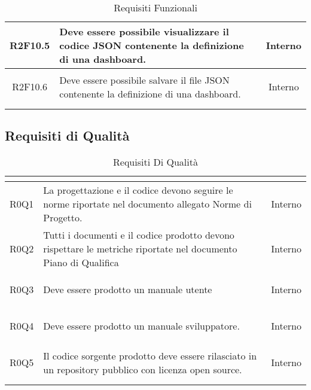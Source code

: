 \begin{longtable}{|c|H|c|}
	\hypertarget{R2F10.5}{R2F10.5} & Deve essere possibile visualizzare il codice JSON contenente la definizione di una dashboard. & Interno \\ \hline 
	\hypertarget{R2F10.6}{R2F10.6} & Deve essere possibile salvare il file JSON contenente la definizione di una dashboard. & Interno \\ \hline 
	
	
	\caption[Requisiti Funzionali]{Requisiti Funzionali}
	\label{tabella:req0}
\end{longtable}
\renewcommand{\arraystretch}{1}
\clearpage
{}
\subsection{Requisiti di Qualità}
\normalsize
\renewcommand{\arraystretch}{1.5}
\begin{longtable}{|c|H|c|}
	\hline
	\textbf{\color{title_text}{Id Requisito}} & \textbf{\color{title_text}{Descrizione}} & \textbf{\color{title_text}{Fonte}}\\
	\hline
	\endhead
	\hypertarget{R0Q1}{R0Q1} & La progettazione e il codice devono seguire le norme riportate nel documento allegato Norme di Progetto. & Interno \\ \hline 
	\hypertarget{R0Q2}{R0Q2} & Tutti i documenti e il codice prodotto devono rispettare le metriche riportate nel documento Piano di Qualifica & Interno \\ \hline 
	\hypertarget{R0Q3}{R0Q3} & Deve essere prodotto un manuale utente & Interno \\ \hline 
	\hypertarget{R0Q4}{R0Q4} & Deve essere prodotto un manuale sviluppatore. & Interno \\ \hline 
	\hypertarget{R0Q5}{R0Q5} & Il codice sorgente prodotto deve essere rilasciato in un repository pubblico con licenza open source. & Interno  \\ \hline
	\caption[Requisiti di Qualità]{Requisiti Di Qualità}
	\label{tabella:req1}
\end{longtable}
\renewcommand{\arraystretch}{1}
\clearpage
{}
